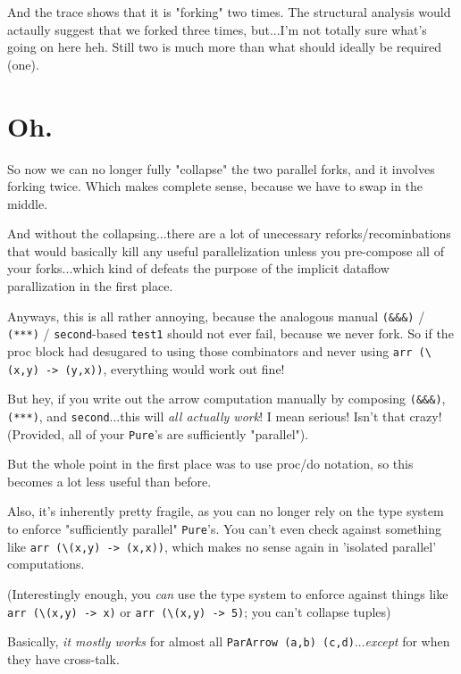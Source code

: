 \documentclass[]{article}
\begin{document}
And the trace shows that it is "forking" two times. The structural analysis
would actaully suggest that we forked three times, but...I'm not totally sure
what's going on here heh. Still two is much more than what should ideally be
required (one).

\section{Oh.}

So now we can no longer fully "collapse" the two parallel forks, and it involves
forking twice. Which makes complete sense, because we have to swap in the
middle.

And without the collapsing...there are a lot of unecessary
reforks/recominbations that would basically kill any useful parallelization
unless you pre-compose all of your forks...which kind of defeats the purpose of
the implicit dataflow parallization in the first place.

Anyways, this is all rather annoying, because the analogous manual
\texttt{(\&\&\&)} / \texttt{(***)} / \texttt{second}-based \texttt{test1} should
not ever fail, because we never fork. So if the proc block had desugared to
using those combinators and never using
\texttt{arr\ (\textbackslash{}(x,y)\ -\textgreater{}\ (y,x))}, everything would
work out fine!

But hey, if you write out the arrow computation manually by composing
\texttt{(\&\&\&)}, \texttt{(***)}, and \texttt{second}...this will \emph{all
actually work}! I mean serious! Isn't that crazy! (Provided, all of your
\texttt{Pure}'s are sufficiently "parallel").

But the whole point in the first place was to use proc/do notation, so this
becomes a lot less useful than before.

Also, it's inherently pretty fragile, as you can no longer rely on the type
system to enforce "sufficiently parallel" \texttt{Pure}'s. You can't even check
against something like
\texttt{arr\ (\textbackslash{}(x,y)\ -\textgreater{}\ (x,x))}, which makes no
sense again in 'isolated parallel' computations.

(Interestingly enough, you \emph{can} use the type system to enforce against
things like \texttt{arr\ (\textbackslash{}(x,y)\ -\textgreater{}\ x)} or
\texttt{arr\ (\textbackslash{}(x,y)\ -\textgreater{}\ 5)}; you can't collapse
tuples)

Basically, \emph{it mostly works} for almost all
\texttt{ParArrow\ (a,b)\ (c,d)}...\emph{except} for when they have cross-talk.
\end{document}
